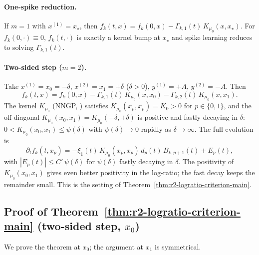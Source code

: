 \documentclass[nohyperref]{article}
\theoremstyle{plain}
\theoremstyle{definition}
\theoremstyle{remark}
\begin{document}
\paragraph{One-spike reduction.}
If $m=1$ with $x^{(1)}=x_\star$, then $f_k(t,x)=f_k(0,x)-\Gamma_{k,1}(t)\,K_{\mu_0}(x,x_\star)$. For $f_k(0,\cdot)\equiv 0$, $f_k(t,\cdot)$ is exactly a kernel bump at $x_\star$ and spike learning reduces to solving $\Gamma_{k,1}(t)$.

\paragraph{Two-sided step ($m=2$).}
Take $x^{(1)}=x_0=-\delta$, $x^{(2)}=x_1=+\delta$ ($\delta>0$), $y^{(1)}=+A$, $y^{(2)}=-A$. Then
\[
f_k(t,x)=f_k(0,x)-\Gamma_{k,1}(t)\,K_{\mu_0}(x,x_0)-\Gamma_{k,2}(t)\,K_{\mu_0}(x,x_1).
\]
The kernel $K_{\mu_0}$ (NNGP, \cite{jacot2018neural}) satisfies $K_{\mu_0}(x_p,x_p)=K_0>0$ for $p\in\{0,1\}$, and the off-diagonal $K_{\mu_0}(x_0,x_1)=K_{\mu_0}(-\delta,+\delta)$ is positive and fastly decaying in $\delta$: $0<K_{\mu_0}(x_0,x_1)\le \psi(\delta)$ with $\psi(\delta)\to 0$ rapidly as $\delta\to\infty$. The full evolution is
\[
\partial_t f_k(t,x_p)=-\xi_1(t)\,K_{\mu_0}(x_p,x_p)\,d_p(t)\,B_{k,p+1}(t)+E_p(t),
\]
with $|E_p(t)|\le C'\,\psi(\delta)$ for $\psi(\delta)$ fastly decaying in $\delta$. The positivity of $K_{\mu_0}(x_0,x_1)$ gives even better positivity in the log-ratio; the fast decay keeps the remainder small. This is the setting of Theorem~\ref{thm:r2-logratio-criterion-main}.

\subsection{Proof of Theorem~\ref{thm:r2-logratio-criterion-main} (two-sided step, $x_0$)}
\label{app:r2-logratio-proof}

We prove the theorem at $x_0$; the argument at $x_1$ is symmetrical.
\end{document}
